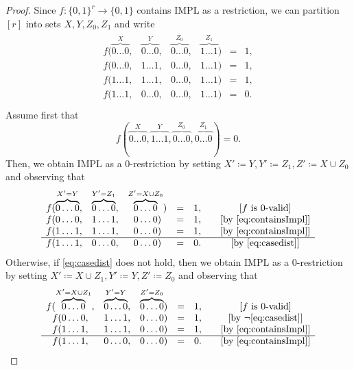 \documentclass[10pt,a4paper]{article}
\theoremstyle{plain}
\newcommand{\Impl}{\mathrm{IMPL}}
\newcommand{\entry}[1]{#1 \dots #1}
\begin{document}
\begin{proof}
Since $f:\{0,1\}^r \to \{0,1\}$ contains $\Impl$ as a restriction, we can partition $[r]$ into sets $X,Y,Z_0,Z_1$ and write
\begin{align}\label{eq:containsImpl}
\begin{matrix}
f( \overbrace{\entry{0}}^{X},& \overbrace{\entry{0}}^{Y}, & \overbrace{\entry{0}}^{Z_0}, & \overbrace{\entry{1}}^{Z_1}) & = & 1,\\
f( \entry{0},& \entry{1}, & \entry{0}, & \entry{1}) & = & 1,\\
f( \entry{1},& \entry{1}, & \entry{0}, & \entry{1}) & = & 1,\\
  \hline
f( \entry{1},& \entry{0}, & \entry{0}, & \entry{1}) & = & 0.\\
\end{matrix}
\end{align}
Assume first that 
\begin{equation}\label{eq:casedist}
f(\overbrace{\entry{0}}^{X}, \overbrace{\entry{1}}^Y, \overbrace{\entry{0}}^{Z_0}, \overbrace{\entry{0}}^{Z_1}) = 0.
\end{equation}
Then, we obtain $\Impl$ as a 0-restriction by setting $X'\coloneqq Y, Y'\coloneqq Z_1, Z' \coloneqq X\cup Z_0$ and observing that
\begin{align*}
\begin{matrix}
f( \overbrace{\entry{0}}^{X'=Y},& \overbrace{\entry{0}}^{Y'=Z_1}, & \overbrace{\entry{0}}^{Z'=X\cup Z_0}) & = & 1, & \quad \text{[$f$ is $0$-valid]}\\
f( \entry{0},& \entry{1}, & \entry{0}) & = & 1, & \quad\text{[by \eqref{eq:containsImpl}]}\\
f( \entry{1},& \entry{1}, & \entry{0}) & = & 1, & \quad\text{[by \eqref{eq:containsImpl}]}\\
  \hline
f( \entry{1},& \entry{0}, & \entry{0}) & = & 0. & \quad\text{[by \eqref{eq:casedist}]}\\
\end{matrix}
\end{align*}
Otherwise, if \eqref{eq:casedist} does not hold, then we obtain $\Impl$ as a 0-restriction by setting $X'\coloneqq X\cup Z_1, Y' \coloneqq Y, Z' \coloneqq Z_0$ and observing that 
\begin{align*}
\begin{matrix}
f( \overbrace{\entry{0}}^{X'=X\cup Z_1},& \overbrace{\entry{0}}^{Y'=Y}, & \overbrace{\entry{0}}^{Z'=Z_0}) & = & 1, & \quad \text{[$f$ is $0$-valid]}\\
f( \entry{0},& \entry{1}, & \entry{0}) & = & 1, & \quad\text{[by $\neg$\eqref{eq:casedist}]}\\
f( \entry{1},& \entry{1}, & \entry{0}) & = & 1, & \quad\text{[by \eqref{eq:containsImpl}]}\\
  \hline
f( \entry{1},& \entry{0}, & \entry{0}) & = & 0. & \quad\text{[by \eqref{eq:containsImpl}]}\\
\end{matrix}
\end{align*}
\end{proof}
\end{document}
